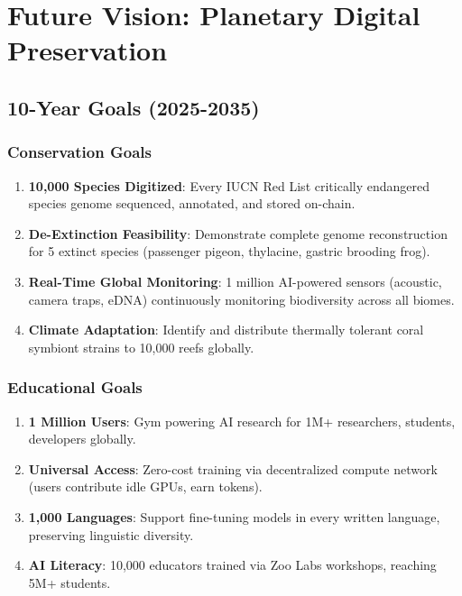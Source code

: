 \section{Future Vision: Planetary Digital Preservation}


\subsection{10-Year Goals (2025-2035)}

\subsubsection{Conservation Goals}
\begin{enumerate}
    \item \textbf{10,000 Species Digitized}: Every IUCN Red List critically endangered species genome sequenced, annotated, and stored on-chain.
    \item \textbf{De-Extinction Feasibility}: Demonstrate complete genome reconstruction for 5 extinct species (passenger pigeon, thylacine, gastric brooding frog).
    \item \textbf{Real-Time Global Monitoring}: 1 million AI-powered sensors (acoustic, camera traps, eDNA) continuously monitoring biodiversity across all biomes.
    \item \textbf{Climate Adaptation}: Identify and distribute thermally tolerant coral symbiont strains to 10,000 reefs globally.
\end{enumerate}

\subsubsection{Educational Goals}
\begin{enumerate}
    \item \textbf{1 Million Users}: Gym powering AI research for 1M+ researchers, students, developers globally.
    \item \textbf{Universal Access}: Zero-cost training via decentralized compute network (users contribute idle GPUs, earn tokens).
    \item \textbf{1,000 Languages}: Support fine-tuning models in every written language, preserving linguistic diversity.
    \item \textbf{AI Literacy}: 10,000 educators trained via Zoo Labs workshops, reaching 5M+ students.
\end{enumerate}

